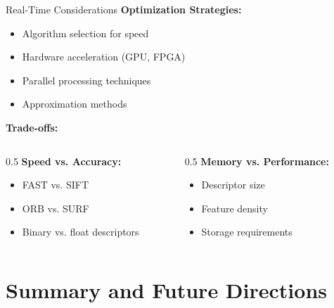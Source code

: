 \documentclass[aspectratio=169,10pt]{beamer}
\begin{document}
\begin{frame}{Real-Time Considerations}
    \textbf{Optimization Strategies:}
    \begin{itemize}
        \item Algorithm selection for speed
        \item Hardware acceleration (GPU, FPGA)
        \item Parallel processing techniques
        \item Approximation methods
    \end{itemize}

    \textbf{Trade-offs:}
    \begin{columns}[c]
        \begin{column}{0.5\textwidth}
            \textbf{Speed vs. Accuracy:}
            \begin{itemize}
                \item FAST vs. SIFT
                \item ORB vs. SURF
                \item Binary vs. float descriptors
            \end{itemize}
        \end{column}
        \begin{column}{0.5\textwidth}
            \textbf{Memory vs. Performance:}
            \begin{itemize}
                \item Descriptor size
                \item Feature density
                \item Storage requirements
            \end{itemize}
        \end{column}
    \end{columns}
\end{frame}

\section{Summary and Future Directions}
\end{document}
